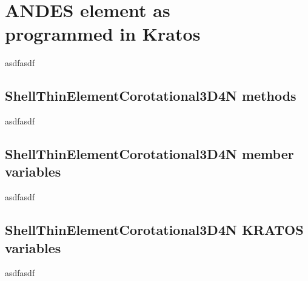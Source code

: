 
\chapter[ANDES element as programmed in Kratos]{ANDES element as \\programmed in Kratos}
\label{app:ANDES element as programmed in Kratos}
\renewcommand{\Thema}{ANDES element as programmed in Kratos}

asdfasdf

\section{ShellThinElementCorotational3D4N methods}
asdfasdf

\section{ShellThinElementCorotational3D4N member variables}
asdfasdf

\section{ShellThinElementCorotational3D4N KRATOS variables}
asdfasdf